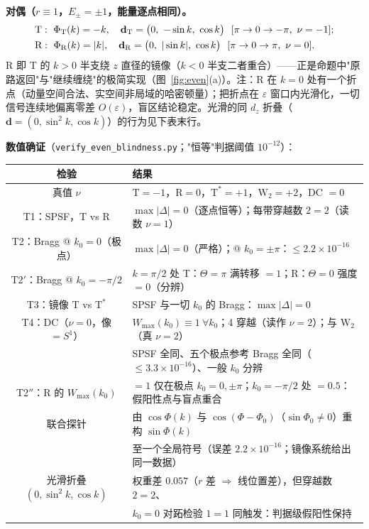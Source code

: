 \documentclass[onecolumn,aps,prl,superscriptaddress,longbibliography]{revtex4-2}
\begin{document}
\textbf{对偶（$r\equiv1$，$E_\pm=\pm1$，能量逐点相同）。}
\begin{equation}\label{eq:pair}
\begin{aligned}
&\mathrm{T}:\ \Phi_{\rm T}(k)=-k,\quad \mathbf{d}_{\rm T}=\big(0,\ -\sin k,\ \cos k\big)\ \ [\pi\to0\to-\pi,\ \nu=-1];\\
&\mathrm{R}:\ \Phi_{\rm R}(k)=|k|,\quad \mathbf{d}_{\rm R}=\big(0,\ |\sin k|,\ \cos k\big)\ \ [\pi\to0\to\pi,\ \nu=0].
\end{aligned}
\end{equation}
R 即 T 的 $k>0$ 半支绕 $z$ 直径的镜像（$k<0$ 半支二者重合）——正是命题中"原路返回"与"继续缠绕"的极简实现（图~\ref{fig:even}(a)）。注：R 在 $k=0$ 处有一个折点（动量空间合法、实空间非局域的哈密顿量）；把折点在 $\varepsilon$ 窗口内光滑化，一切信号连续地偏离零差 $O(\varepsilon)$，盲区结论稳定。光滑的同 $d_z$ 折叠（$\mathbf{d}=(0,\sin^2k,\cos k)$）的行为见下表末行。

\textbf{数值确证}（\texttt{verify\_even\_blindness.py}；"恒等"判据阈值 $10^{-12}$）：
\begin{center}
\renewcommand\arraystretch{1.35}
\begin{tabular}{c|l}
\hline
检验 & 结果 \\
\hline
真值 $\nu$ & $\mathrm{T}=-1$，$\mathrm{R}=0$，$\mathrm{T}^*=+1$，$\mathrm{W}_2=+2$，DC $=0$ \\
T1：SPSF，$\mathrm{T}$ vs $\mathrm{R}$ & $\max|\Delta|=0$（逐点恒等）；每带穿越数 $2=2$（读数 $\nu=1$） \\
T2：Bragg @ $k_0=0$（极点） & $\max|\Delta|=0$（严格）；@ $k_0=\pm\pi$：$\le2.2\times10^{-16}$ \\
T2$'$：Bragg @ $k_0=-\pi/2$ & $k=\pi/2$ 处 T：$\Theta=\pi$ 满转移 $=1$；R：$\Theta=0$ 强度 $=0$（分辨） \\
T3：镜像 $\mathrm{T}$ vs $\mathrm{T}^*$ & SPSF 与一切 $k_0$ 的 Bragg：$\max|\Delta|=0$ \\
T4：DC（$\nu=0$，像 $=S^1$） & $W_{\max}(k_0)\equiv1\ \forall k_0$；4 穿越（读作 $\nu=2$）；与 $\mathrm{W}_2$（真 $\nu=2$）\\
 & SPSF 全同、五个极点参考 Bragg 全同（$\le3.3\times10^{-16}$）、一般 $k_0$ 分辨 \\
T2$''$：$\mathrm{R}$ 的 $W_{\max}(k_0)$ & $=1$ 仅在极点 $k_0=0,\pm\pi$；$k_0=-\pi/2$ 处 $=0.5$：假阳性点与盲点重合 \\
联合探针 & 由 $\cos\Phi(k)$ 与 $\cos(\Phi-\Phi_0)$（$\sin\Phi_0\neq0$）重构 $\sin\Phi(k)$ \\
 & 至一个全局符号（误差 $2.2\times10^{-16}$；镜像系统给出同一数据） \\
光滑折叠 $(0,\sin^2k,\cos k)$ & 权重差 $0.057$（$r$ 差 $\Rightarrow$ 线位置差），但穿越数 $2=2$、\\
 & $k_0=0$ 对跖检验 $1=1$ 同触发：判据级假阳性保持 \\
\hline
\end{tabular}
\end{center}
\end{document}
